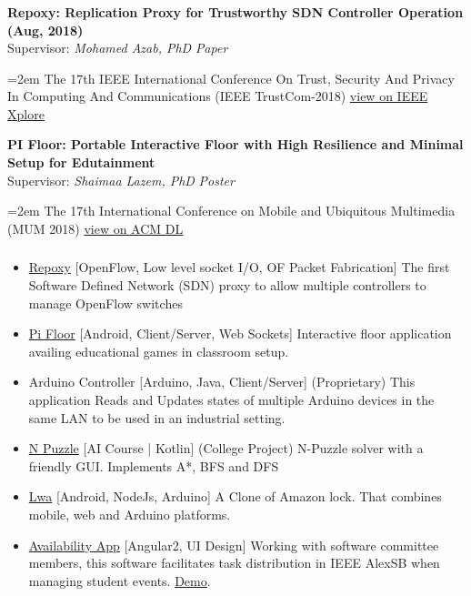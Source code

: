 \documentclass[paper=a4,fontsize=11pt]{scrartcl} %
\newcommand{\NewPart}[1]{\subsubsection{\color{AccentColor}{\textsc{#1}}}}
\newcommand{\ResearchEntry}[4]{
		\noindent \textbf{#1} \\      %
		\noindent Supervisor: \textit{#2} \hfill \textit{#3} \par         %
		\noindent\hangindent=2em\hangafter=0 \small #4 %
		\normalsize \par}
\begin{document}
\NewPart{Publications}{}
\ResearchEntry{Repoxy: Replication Proxy for Trustworthy SDN Controller Operation (Aug, 2018)}{Mohamed Azab, PhD}{Paper}{
	The 17th IEEE International Conference On Trust, Security And Privacy In Computing And Communications (IEEE TrustCom-2018) \href{https://ieeexplore.ieee.org/document/8455887/}{view on IEEE Xplore}
}
\ResearchEntry{PI Floor: Portable Interactive Floor with High Resilience and Minimal Setup for Edutainment}{Shaimaa Lazem, PhD}{Poster}{
	The 17th International Conference on Mobile and Ubiquitous Multimedia (MUM 2018) \href{https://dl.acm.org/citation.cfm?doid=3282894.3289734}{view on ACM DL}
}
\NewPart{Projects}{}
\begin{itemize}
	\item \href{https://github.com/shakram02/Repoxy}{Repoxy} [OpenFlow, Low level socket I/O, OF Packet Fabrication] The first Software Defined Network (SDN) proxy to allow multiple controllers to manage OpenFlow switches
	\item \href{https://github.com/shakram02/PiFloor}{Pi Floor} [Android, Client/Server, Web Sockets] Interactive floor application availing educational games in classroom setup.
	\item Arduino Controller [Arduino, Java, Client/Server] (Proprietary) This application Reads and Updates states of multiple Arduino devices in the same LAN to be used in an industrial setting.

	\item \href{https://github.com/shakram02/Npuzzle-GUI}{N Puzzle} [AI Course | Kotlin] (College Project) N-Puzzle solver with a friendly GUI. Implements A*, BFS and DFS
	\item \href{https://github.com/shakram02/Lwa-Web} {Lwa} [Android, NodeJs, Arduino] A Clone of Amazon lock. That combines mobile, web and Arduino platforms.

	\item \href{https://github.com/alexsb-software/events-app}{Availability App} [Angular2, UI Design] Working with software committee members, this software facilitates task distribution in IEEE AlexSB when managing student events. \href{https://www.youtube.com/watch?v=ewxyfzxKQ8g}{Demo}.
\end{itemize}
\end{document}
